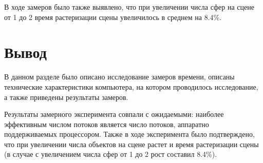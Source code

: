 В ходе замеров было также выявлено, что при увеличении числа сфер на сцене от 1 до 2 время растеризации сцены увеличилось в среднем на 8.4\%.


\section*{Вывод}
В данном разделе было описано исследование замеров времени, описаны технические характеристики компьютера, на котором проводилось исследование, а также приведены результаты замеров. 

Результаты замерного эксперимента совпали с ожидаемыми: наиболее эффективным числом потоков является число потоков, аппаратно поддерживаемых процессором. Также в ходе эксперимента было подтверждено, что при увеличении числа объектов на сцене растет и время растеризации сцены (в случае с увеличением числа сфер от 1 до 2 рост составил 8.4\%).


\clearpage
